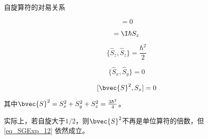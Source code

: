 \begin{theorem}{自旋算符的对易关系}

\begin{equation}
[\hat{S}_z, \hat{S}_z]=0
\end{equation}

\begin{equation}
[\hat{S}_x, \hat{S}_y]=\I\hbar S_z
\end{equation}

\begin{equation}\label{eq_SGExp_11}
\{\hat{S}_z, \hat{S}_z\}=\frac{\hbar^2}{2}
\end{equation}

\begin{equation}
\{\hat{S}_x, \hat{S}_y\}=0
\end{equation}

\begin{equation}\label{eq_SGExp_12}
[\bvec{S}^2, S_x]=0
\end{equation}

其中$\bvec{S}^2=S_x^2+S_y^2+S_z^2=\frac{3\hbar^2}{4}$。

\end{theorem}

实际上，若自旋大于$1/2$，则$\bvec{S}^2$不再是单位算符的倍数，但\autoref{eq_SGExp_12} 依然成立。











